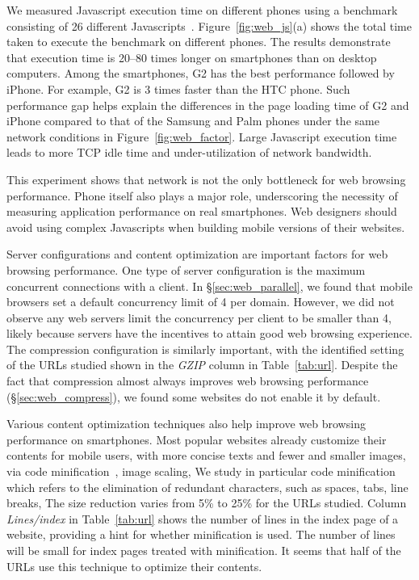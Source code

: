 We measured Javascript execution time on different phones using a
benchmark consisting of 26 different Javascripts~\cite{sunspider}.
Figure~\ref{fig:web_js}(a) shows the total time taken to execute 
the benchmark on different phones. The results demonstrate that
execution time is 20--80 times longer on smartphones than on desktop
computers. Among the smartphones, G2 has the best performance 
followed by iPhone. For example, G2 is 3 times faster than the HTC
phone. Such performance gap helps explain the differences in the
page loading time of G2 and iPhone compared to that of the Samsung 
and Palm phones under the same network conditions in 
Figure~\ref{fig:web_factor}. Large Javascript execution time leads 
to more TCP idle time and under-utilization of network bandwidth.

This experiment shows that network is not the only bottleneck for 
web browsing performance. Phone itself also plays a major role, 
underscoring the necessity of measuring application performance
on real smartphones. Web designers should avoid using complex
Javascripts when building mobile versions of their websites. 


\label{sec:web_server}

Server configurations and content optimization are important factors 
for web browsing performance. One type of server configuration is 
the maximum concurrent connections with a client. In 
\S\ref{sec:web_parallel}, we found that mobile browsers set a
default concurrency limit of 4 per domain. However, we did not observe 
any web servers limit the concurrency per client to be smaller than 4, 
likely because servers have the incentives to attain good web browsing 
experience. The compression configuration is similarly important, with 
the identified setting of the URLs studied shown in the {\em GZIP} 
column in Table~\ref{tab:url}. Despite the fact that compression almost 
always improves web browsing performance (\S\ref{sec:web_compress}), 
we found some websites do not enable it by default.

Various content optimization techniques also help improve web 
browsing performance on smartphones. Most popular websites already 
customize their contents for mobile users, with more concise texts 
and fewer and smaller images, \eg via code 
minification~\cite{minification}, image scaling, \etc We study in 
particular code minification which refers to the elimination of 
redundant characters, such as spaces, tabs, line breaks, \etc The 
size reduction varies from 5\% to 25\% for the URLs studied. 
Column {\em Lines/index} in Table~\ref{tab:url} shows the number of 
lines in the index page of a website, providing a hint for whether 
minification is used. The number of lines will be small for index
pages treated with minification. It seems that half of the URLs use 
this technique to optimize their contents.

